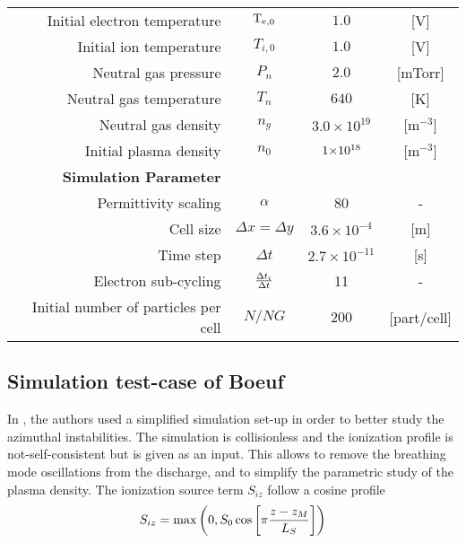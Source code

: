 \begin{table}[htb]
\begin{tabular}{@{}r c c c@{}}
          Initial electron temperature & $\mathrm{T_e}_{,0}  $               & $1.0$                 & [{V}] \\
          Initial ion temperature & $T_{i,0}   $               & $1.0$                 & [{V}] \\
          Neutral gas pressure & $P_{n}     $               & $2.0$                 & [{mTorr}] \\
          Neutral gas temperature & $T_{n}     $               & $640$                 & [{K}] \\
          Neutral gas density & $n_{g}     $               & $3.0 \times 10^{19}$ & [{m}$^{-3}$]\\
          Initial plasma density & $n_0$ & ${{1}{\times}10^{18}}$ &  [{m}$^{-3}$]\\
          \midrule
          {\bf Simulation Parameter} &  &   &  \\
          Permittivity scaling & $\alpha$ & 80 & - \\
          Cell size & $\Delta x = \Delta y$ & $3.6 \times 10^{-4}$  & [{m}] \\
          Time step & $\Delta t  $                      & $2.7 \times 10^{-11}$ & [{s}] \\
          Electron sub-cycling & $\frac{\Delta t_{i}}{\Delta t}$ & 11 & - \\
          Initial number of particles per cell & $N/NG      $    & $200$   & [{part/cell}] \\
          \bottomrule
       \end{tabular}
    \end{table}
    
\subsection{Simulation test-case of Boeuf} \label{subsec-boeuf_description}

In \citet{boeuf2018}, the authors used a simplified simulation set-up in order to better study the azimuthal instabilities.
The simulation is collisionless and the ionization profile is not-self-consistent but  is given as an input.
This allows to remove the breathing mode oscillations from the discharge, and to simplify the parametric study of the plasma density.
The ionization source term $S_{iz}$ follow a cosine profile
\begin{equation} \label{eq-siz_profile}
  S_{iz} = \max \left( 0, S_0 \cos \left[ \pi \frac{z - z_M}{L_S} \right] \right)
\end{equation}

